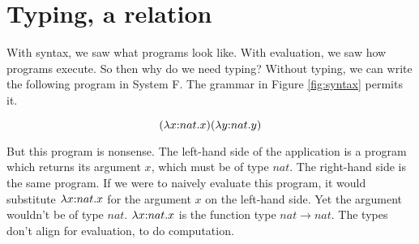 \section{Typing, a relation}

With syntax, we saw what programs look like. With evaluation, we saw how programs execute. So then why do we need typing? Without typing, we can write the following program in System F. The grammar in Figure \ref{fig:syntax} permits it. \vspace*{-1.0em}
\begin{singlespace}
$$(\lambda x{:}nat.x)(\lambda y{:}nat.y)$$ 
\end{singlespace}
But this program is nonsense. The left-hand side of the application is a program which returns its argument $x$, which must be of type $nat$. The right-hand side is the same program. If we were to naively evaluate this program, it would substitute $\lambda x{:}nat.x$ for the argument $x$ on the left-hand side. Yet the argument wouldn't be of type $nat$. $\lambda x{:}nat.x$ is the function type $nat\!\to\!nat$. The types don't align for evaluation, to do computation.

